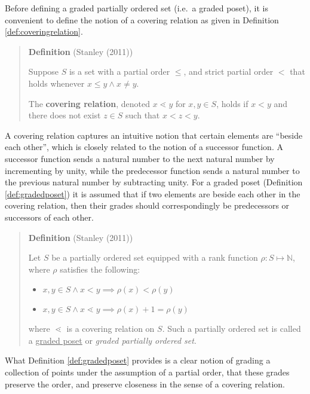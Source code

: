 \documentclass[
  letterpaper,
  DIV=11,
  numbers=noendperiod]{scrreprt}
\begin{document}
Before defining a graded partially ordered set (i.e.~a graded poset), it
is convenient to define the notion of a covering relation as given in
Definition \ref{def:coveringrelation}.

\begin{quote}
\textbf{Definition} (Stanley (2011))

Suppose \(S\) is a set with a partial order \(\leq\), and strict partial
order \(<\) that holds whenever \(x \leq y \land x \neq y\).

The \textbf{covering relation}, denoted \(x \lessdot y\) for
\(x,y \in S\), holds if \(x < y\) and there does not exist \(z \in S\)
such that \(x < z < y\).
\end{quote}

A covering relation captures an intuitive notion that certain elements
are ``beside each other'', which is closely related to the notion of a
successor function. A successor function sends a natural number to the
next natural number by incrementing by unity, while the predecessor
function sends a natural number to the previous natural number by
subtracting unity. For a graded poset (Definition \ref{def:gradedposet})
it is assumed that if two elements are beside each other in the covering
relation, then their grades should correspondingly be predecessors or
successors of each other.

\begin{quote}
\textbf{Definition} (Stanley (2011))

Let \(S\) be a partially ordered set equipped with a rank function
\(\rho: S \mapsto \mathbb{N}\), where \(\rho\) satisfies the following:

\begin{itemize}
\item $x,y \in S \land x < y \implies \rho(x) < \rho(y)$
\item $x,y \in S \land x \lessdot y \implies \rho(x) + 1 = \rho(y)$
\end{itemize}

where \(\lessdot\) is a covering relation on \(S\). Such a partially
ordered set is called a \underline{graded poset} or
\textit{graded partially ordered set}.
\end{quote}

What Definition \ref{def:gradedposet} provides is a clear notion of
grading a collection of points under the assumption of a partial order,
that these grades preserve the order, and preserve closeness in the
sense of a covering relation.
\end{document}
